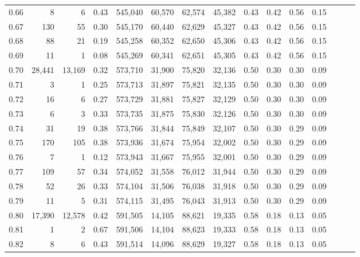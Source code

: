 \begin{tabular}{rrrrrrrrrrrrrrr}
0.66 &       8 &       6 &  0.43 &  545,040 &   60,570 &   62,574 &   45,382 &  0.43 &  0.42 &  0.56 &      0.15 \\
0.67 &     130 &      55 &  0.30 &  545,170 &   60,440 &   62,629 &   45,327 &  0.43 &  0.42 &  0.56 &      0.15 \\
0.68 &      88 &      21 &  0.19 &  545,258 &   60,352 &   62,650 &   45,306 &  0.43 &  0.42 &  0.56 &      0.15 \\
0.69 &      11 &       1 &  0.08 &  545,269 &   60,341 &   62,651 &   45,305 &  0.43 &  0.42 &  0.56 &      0.15 \\
0.70 &  28,441 &  13,169 &  0.32 &  573,710 &   31,900 &   75,820 &   32,136 &  0.50 &  0.30 &  0.30 &      0.09 \\
0.71 &       3 &       1 &  0.25 &  573,713 &   31,897 &   75,821 &   32,135 &  0.50 &  0.30 &  0.30 &      0.09 \\
0.72 &      16 &       6 &  0.27 &  573,729 &   31,881 &   75,827 &   32,129 &  0.50 &  0.30 &  0.30 &      0.09 \\
0.73 &       6 &       3 &  0.33 &  573,735 &   31,875 &   75,830 &   32,126 &  0.50 &  0.30 &  0.30 &      0.09 \\
0.74 &      31 &      19 &  0.38 &  573,766 &   31,844 &   75,849 &   32,107 &  0.50 &  0.30 &  0.29 &      0.09 \\
0.75 &     170 &     105 &  0.38 &  573,936 &   31,674 &   75,954 &   32,002 &  0.50 &  0.30 &  0.29 &      0.09 \\
0.76 &       7 &       1 &  0.12 &  573,943 &   31,667 &   75,955 &   32,001 &  0.50 &  0.30 &  0.29 &      0.09 \\
0.77 &     109 &      57 &  0.34 &  574,052 &   31,558 &   76,012 &   31,944 &  0.50 &  0.30 &  0.29 &      0.09 \\
0.78 &      52 &      26 &  0.33 &  574,104 &   31,506 &   76,038 &   31,918 &  0.50 &  0.30 &  0.29 &      0.09 \\
0.79 &      11 &       5 &  0.31 &  574,115 &   31,495 &   76,043 &   31,913 &  0.50 &  0.30 &  0.29 &      0.09 \\
0.80 &  17,390 &  12,578 &  0.42 &  591,505 &   14,105 &   88,621 &   19,335 &  0.58 &  0.18 &  0.13 &      0.05 \\
0.81 &       1 &       2 &  0.67 &  591,506 &   14,104 &   88,623 &   19,333 &  0.58 &  0.18 &  0.13 &      0.05 \\
0.82 &       8 &       6 &  0.43 &  591,514 &   14,096 &   88,629 &   19,327 &  0.58 &  0.18 &  0.13 &      0.05 \\

\end{tabular}
